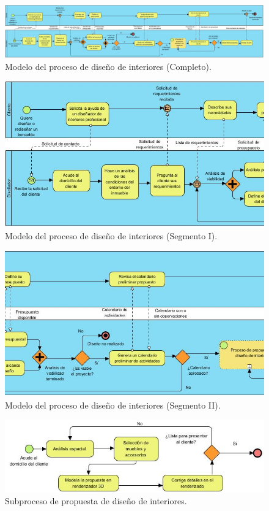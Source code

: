 \begin{figure}[!htbp]
	\centering
	\includegraphics[width=20cm,angle=270,origin=c]{imagenes/marcoteorico/bpmn/proceso_full.jpg}
	\caption{Modelo del proceso de diseño de interiores (Completo).}
	\label{fig:bpmn_antes}
\end{figure}
\newpage

\begin{figure}[!htbp]
	\centering
	\includegraphics[width=19cm,angle=270,origin=c]{imagenes/marcoteorico/bpmn/proceso_01_01.jpg}
	\caption{Modelo del proceso de diseño de interiores (Segmento I).}
	\label{fig:bpmn_antes}
\end{figure}
\newpage

\begin{figure}[!htbp]
	\centering
	\includegraphics[width=19cm,angle=270,origin=c]{imagenes/marcoteorico/bpmn/proceso_02_01.jpg}
	\caption{Modelo del proceso de diseño de interiores (Segmento II).}
	\label{fig:bpmn_antes}
\end{figure}
\newpage

\begin{figure}[!htbp]
	\centering
	\includegraphics[width=16cm]{imagenes/marcoteorico/bpmn/subproceso.jpg}
	\caption{Subproceso de propuesta de diseño de interiores.}
	\label{fig:subproceso}
\end{figure}
\newpage
